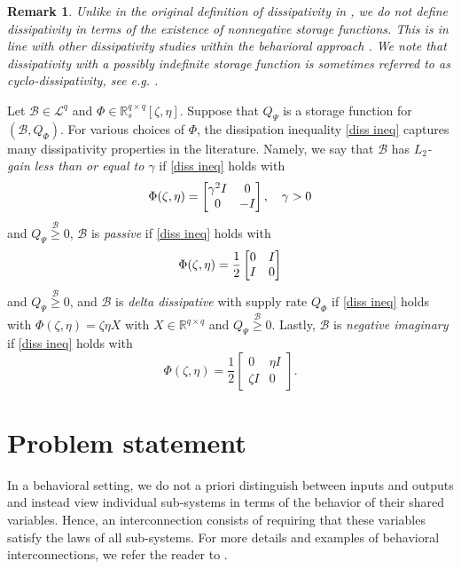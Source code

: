 \documentclass[letterpaper, 10 pt, conference]{ieeeconf}
\theoremstyle{ieeeconf}
\newtheorem{remark}{Remark}
\newcommand{\R}{\mathbb{R}}
\newcommand{\B}{\mathcal{B}}
\begin{document}
\begin{remark}
	Unlike in the original definition of dissipativity in \cite{willems_dissipative_1972}, we do not define dissipativity in terms of the existence of nonnegative storage functions. This is in line with other dissipativity studies within the behavioral approach  \cite{trentelman_every_1997, willems_quadratic_1998}. We note that dissipativity with a possibly indefinite storage function is sometimes referred to as \emph{cyclo-dissipativity}, see e.g. \cite[Section~3.1]{van_der_schaft_dissipative_2017}.
\end{remark}

Let $\B \in \mathcal{L}^q$ and $\Phi \in \mathbb{R}_s^{q \times q}[\zeta,\eta]$. Suppose that $Q_\Psi$ is a storage function for $(\B,Q_\Phi)$. For various choices of $\Phi$, the dissipation inequality \eqref{diss ineq} captures many dissipativity properties in the literature. Namely, we say that $\B$ has \linebreak \emph{$L_2$-gain less than or equal to $\gamma$} if \eqref{diss ineq} holds with \begin{equation*}\Phi(\zeta,\eta)=\begin{bmatrix}
			\gamma^2 I & 0 \\0 & -I
		\end{bmatrix}, \quad \gamma>0 	\vspace{-1ex}\end{equation*} 
	and $Q_{\Psi}\stackrel{\B}{\geq}0$, $\B$ is \emph{passive} if \eqref{diss ineq} holds with
\begin{equation}\Phi(\zeta,\eta)=\frac{1}{2}\begin{bmatrix}
			0 & I \\ I & 0
		\end{bmatrix} \label{passive sr} \vspace{-1ex}\end{equation} and $Q_\Psi \stackrel{\B}{\geq}0$, and $\B$ is \emph{delta dissipative} with supply rate $Q_\Phi$ if \eqref{diss ineq} holds with $\Phi(\zeta,\eta)=\zeta \eta X$ with $X \in \R^{q \times q}$ and $Q_\Psi \stackrel{\B}{\geq}0$. Lastly, $\B$ is \emph{negative imaginary} if \eqref{diss ineq} holds with \begin{equation}\Phi(\zeta,\eta)=\frac{1}{2}\begin{bmatrix}
			0 & \eta I \\
			\zeta I & 0
		\end{bmatrix}. \label{NI sr} 
\end{equation}
\section{Problem statement}
\label{sec:problem statement}
In a behavioral setting, we do not a priori distinguish between inputs and outputs and instead view individual sub-systems in terms of the behavior of their shared variables. Hence, an interconnection consists of requiring that these variables satisfy the laws of all sub-systems. For more details and examples of behavioral interconnections, we refer the reader to \cite{willems_interconnections_1997}.
\end{document}
